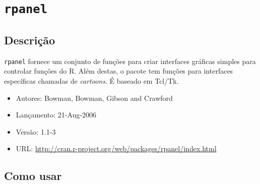 \section{\texttt{rpanel}}

\subsection{Descrição}


\begin{frame}

  \texttt{rpanel} fornece um conjunto de funções para criar interfaces
  gráficas simples para controlar funções do R. Além destas, o pacote
  tem funções para interfaces específicas chamadas de \emph{cartoons}. É
  baseado em Tcl/Tk.

  \begin{itemize}
  \item Autores: Bowman, Bowman, Gibson and Crawford
  \item Lançamento: 21-Aug-2006
  \item Versão: 1.1-3
  \item URL:
    \url{http://cran.r-project.org/web/packages/rpanel/index.html}
  \end{itemize}

\end{frame}


\subsection{Como usar}


